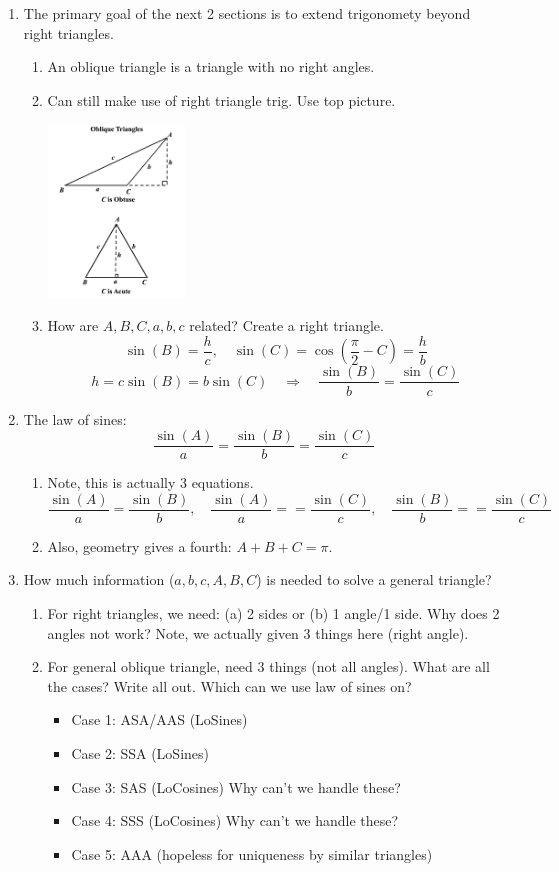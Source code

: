\documentclass{article}
\begin{document}
\begin{enumerate}
\item The primary goal of the next 2 sections is to extend trigonomety beyond right triangles. 
\begin{enumerate}
\item An oblique triangle is a triangle with no right angles.
\item Can still make use of right triangle trig. Use top picture.
\begin{center}
\includegraphics[width=0.3\textwidth]{sines.png}
\end{center}
\item How are $A,B,C,a,b,c$ related? Create a right triangle.
\[
\sin(B) = \frac{h}{c}, \quad \sin(C) = \cos(\frac{\pi}{2}-C) = \frac{h}{b} 
\]
\[
h = c\sin(B) = b\sin(C) \quad \Rightarrow \quad \frac{\sin(B)}{b} = \frac{\sin(C)}{c}
\]
\end{enumerate}

\item The law of sines:
$$
\frac{\sin (A)}{a} = \frac{\sin(B)}{b} = \frac{\sin(C)}{c}
$$
\begin{enumerate}
\item Note, this is actually 3 equations.
$$
\frac{\sin(A)}{a} = \frac{\sin(B)}{b}, \quad \frac{\sin(A)}{a} = = \frac{\sin(C)}{c}, \quad \frac{\sin(B)}{b} = = \frac{\sin(C)}{c}
$$
\item Also, geometry gives a fourth: $A+B+C=\pi$.
\end{enumerate}

\item How much information ($a,b,c,A,B,C$) is needed to solve a general triangle?
\begin{enumerate}
\item For right triangles, we need: (a) 2 sides or (b) 1 angle/1 side. Why does 2 angles not work? Note, we actually given 3 things here (right angle).
\item For general oblique triangle, need 3 things (not all angles). What are all the cases? Write all out. Which can we use law of sines on?
\begin{itemize}
\item Case 1: ASA/AAS (LoSines)
\item Case 2: SSA (LoSines)
\item Case 3: SAS (LoCosines) Why can't we handle these?
\item Case 4: SSS (LoCosines) Why can't we handle these?
\item Case 5: AAA (hopeless for uniqueness by similar triangles)
\end{itemize}
\end{enumerate}


\end{enumerate}
\end{document}
